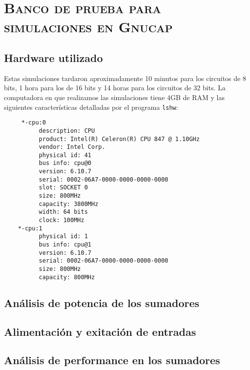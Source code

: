 \chapter{\textsc{ Banco de prueba para simulaciones en Gnucap}}\label{chap:gnucap_testbench}
\section{Hardware utilizado}
Estas simulaciones tardaron aproximadamente 10 minutos para los circuitos de 8 bits, 1 hora para los de 16 bits y 14 horas para los circuitos de 32 bits. La computadora en que realizamos las simulaciones tiene 4GB de RAM y las siguientes características detalladas  por el programa \verb.lshw.:
\begin{footnotesize}
\begin{verbatim}
     *-cpu:0
          description: CPU
          product: Intel(R) Celeron(R) CPU 847 @ 1.10GHz
          vendor: Intel Corp.
          physical id: 41
          bus info: cpu@0
          version: 6.10.7
          serial: 0002-06A7-0000-0000-0000-0000
          slot: SOCKET 0
          size: 800MHz
          capacity: 3800MHz
          width: 64 bits
          clock: 100MHz
    *-cpu:1
          physical id: 1
          bus info: cpu@1
          version: 6.10.7
          serial: 0002-06A7-0000-0000-0000-0000
          size: 800MHz
          capacity: 800MHz
\end{verbatim}
\end{footnotesize}
\section{Análisis de potencia de los sumadores}


\section{Alimentación y exitación de entradas}


\section{Análisis de performance en los sumadores}
